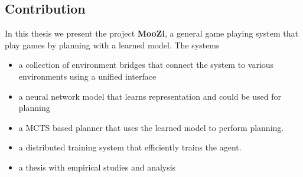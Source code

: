\subsection{Contribution}
In this thesis we present the project \textbf{MooZi}, a general game playing system that play games by planning with a learned model.
The systems 
\begin{itemize}
    \item a collection of environment bridges that connect the system to various environments using a unified interface
    \item a neural network model that learns representation and could be used for planning
    \item a MCTS based planner that uses the learned model to perform planning.
    \item a distributed training system that efficiently trains the agent.
    \item a thesis with empirical studies and analysis
\end{itemize}
